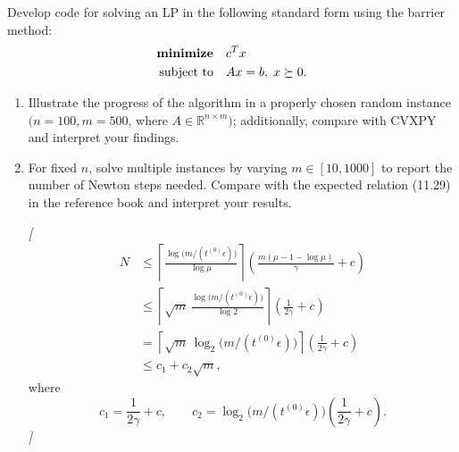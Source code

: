\documentclass[11pt,letter,notitlepage]{article}
\DeclareMathOperator*{\minimize}{\bf minimize}
\theoremstyle{definition}
\begin{document}
\begin{exercise}
Develop code for solving an LP in the following standard form using the barrier method:
\[
\begin{aligned}
\minimize \quad & c^T x \\
\text{subject to} \quad & Ax=b,\; x \succeq 0.
\end{aligned}
\]

\begin{enumerate}[label=(\alph*)]
    \item Illustrate the progress of the algorithm in a properly chosen random instance $(n=100, m=500$, where $A \in \mathbb{R}^{n\times m})$; additionally, compare with CVXPY and interpret your findings.

    \item For fixed $n$, solve multiple instances by varying $m \in [10,1000]$ to report the number of Newton steps needed. Compare with the expected relation (11.29) in the reference book and interpret your results.
    
    \textit{[}
\[
\begin{aligned}
N
&\le
\left\lceil
\frac{\log\!\bigl(m/(t^{(0)}\epsilon)\bigr)}{\log \mu}
\right\rceil
\left(
\frac{m(\mu-1-\log\mu)}{\gamma}+c
\right) \\
&\le
\left\lceil
\sqrt{m}\,
\frac{\log\!\bigl(m/(t^{(0)}\epsilon)\bigr)}{\log 2}
\right\rceil
\left(
\frac{1}{2\gamma}+c
\right) \\
&=
\left\lceil
\sqrt{m}\,\log_2\!\bigl(m/(t^{(0)}\epsilon)\bigr)
\right\rceil
\left(
\frac{1}{2\gamma}+c
\right) \\
&\le c_1 + c_2\sqrt{m},
\end{aligned}
\tag{11.29}
\]
where
\[
c_1=\frac{1}{2\gamma}+c,
\qquad
c_2=\log_2\!\bigl(m/(t^{(0)}\epsilon)\bigr)\left(\frac{1}{2\gamma}+c\right).
\]
\textit{]}
\end{enumerate}
\end{exercise}

\newpage
\end{document}
